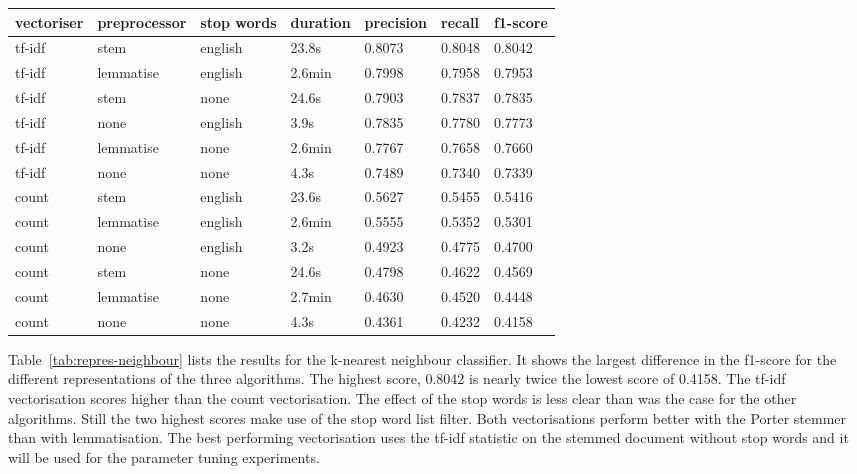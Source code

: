 \documentclass[11pt]{article}
\begin{document}
\begin{table*}[ht]\footnotesize
\centering
\begin{tabular}{ l l l l l l l }
vectoriser & preprocessor & stop words & duration & precision & recall & f1-score \\
\hline
tf-idf & stem & english & 23.8s & 0.8073 & 0.8048 & 0.8042 \\
tf-idf & lemmatise & english & 2.6min & 0.7998 & 0.7958 & 0.7953 \\
tf-idf & stem & none & 24.6s & 0.7903 & 0.7837 & 0.7835 \\
tf-idf & none & english & 3.9s & 0.7835 & 0.7780 & 0.7773  \\
tf-idf & lemmatise & none & 2.6min & 0.7767 & 0.7658 & 0.7660 \\
tf-idf & none & none & 4.3s & 0.7489 & 0.7340 & 0.7339 \\
count & stem & english & 23.6s & 0.5627 & 0.5455 & 0.5416 \\
count & lemmatise & english & 2.6min & 0.5555 & 0.5352 & 0.5301 \\
count & none & english & 3.2s & 0.4923 & 0.4775 & 0.4700 \\
count & stem & none &  24.6s & 0.4798 & 0.4622 & 0.4569 \\
count & lemmatise & none & 2.7min & 0.4630 & 0.4520 & 0.4448 \\
count & none & none & 4.3s & 0.4361 & 0.4232 & 0.4158 \\
\end{tabular}
\caption{scores for different representations and the k-nearest neighbour classifier sorted by f1-score}
\label{tab:repres-neighbour}
\end{table*}

Table~\ref{tab:repres-neighbour} lists the results for the k-nearest neighbour classifier. It shows the largest difference in the f1-score for the different representations of the three algorithms. The highest score, 0.8042 is nearly twice the lowest score of 0.4158. The tf-idf vectorisation scores higher than the count vectorisation. The effect of the stop words is less clear than was the case for the other algorithms. Still the two highest scores make use of the stop word list filter. Both vectorisations perform better with the Porter stemmer than with lemmatisation. The best performing vectorisation uses the tf-idf statistic on the stemmed document without stop words and it will be used for the parameter tuning experiments.
\end{document}
